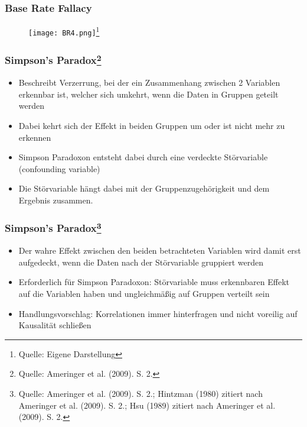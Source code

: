 \documentclass{beamer}
\begin{document}
\begin{frame}
\frametitle{Base Rate Fallacy}

\begin{figure}
    \centering
    \texttt{[image: BR4.png]}\footnote{Quelle: {Eigene Darstellung}}
    
\end{figure}

\end{frame}

\begin{frame}
\frametitle{Simpson's Paradox\footnote{Quelle: {Ameringer et al. (2009). S. 2.}}}
\begin{itemize}
    \item Beschreibt Verzerrung, bei der ein Zusammenhang zwischen 2 Variablen erkennbar ist, welcher sich umkehrt, wenn die Daten in Gruppen geteilt werden
    \item Dabei kehrt sich der Effekt in beiden Gruppen um oder ist nicht mehr zu erkennen
    \item Simpson Paradoxon entsteht dabei durch eine verdeckte Störvariable (confounding variable)
    \item Die Störvariable hängt dabei mit der Gruppenzugehörigkeit und dem Ergebnis zusammen.
\end{itemize}
\end{frame}

\begin{frame}
\frametitle{Simpson's Paradox\footnote{Quelle: {Ameringer et al. (2009). S. 2.; Hintzman (1980) zitiert nach Ameringer et al. (2009). S. 2.; Hsu (1989) zitiert nach Ameringer et al. (2009). S. 2.}}}
\begin{itemize}
    \item Der wahre Effekt zwischen den beiden betrachteten Variablen wird damit erst aufgedeckt, wenn die Daten nach der Störvariable gruppiert werden
    \item Erforderlich für Simpson Paradoxon: Störvariable muss erkennbaren Effekt auf die Variablen haben und ungleichmäßig auf Gruppen verteilt sein
    \item Handlungsvorschlag: Korrelationen immer hinterfragen und nicht voreilig auf Kausalität schließen
\end{itemize}
\end{frame}
\end{document}
